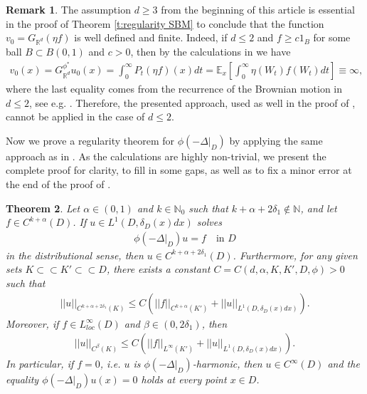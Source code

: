 \documentclass[12pt,a4paper,onecolumn]{amsart}
\newtheorem{thm}{Theorem}[section]
\theoremstyle{definition}
\newtheorem{rem}[thm]{Remark}
\newcommand{\R}{\mathbb{R}}
\newcommand{\N}{\mathbb{N}}
\newcommand{\ex}{\mathbb{E}}
\newcommand{\subsub}{\subset\subset}
\newcommand{\1}{\mathbf 1}
\newcommand{\LLL}{L^1(D,\de(x)dx)}
\newcommand{\Lo}{\phi(-\left.\Delta\right\vert_{D})}
\newcommand{\de}{\delta_D}
\numberwithin{equation}{section}
\begin{document}
 
\begin{rem}\label{r:Gf indefinite no1}
The assumption $d\ge3$ from the beginning of this article is essential in the proof of Theorem \ref{t:regularity SBM} to conclude that the function $v_0=G_{\R^d}(\eta f)$ is well defined and finite. Indeed, if $d\le 2$ and $f\ge c1_B$ for some ball $B\subset B(0,1)$ and $c>0$, then by the calculations in \cite[Propsition 14.2]{bernstein} we have
    \begin{align*}
        v_0(x)=G^{\phi^*}_{\R^d}u_0(x)=\int_0^\infty P_t(\eta f)(x)dt=\ex_x\left[\int_0^\infty \eta(W_t)f(W_t)dt\right]\equiv \infty,
    \end{align*}
    where the last equality comes from the recurrence of the Brownian motion in $d\le 2$, see e.g. \cite[Theorem 3.27]{morters_peres_BM}. Therefore, the presented approach, used as well in the proof of \cite[Proposition 2.8]{Silvestre2007regularity}, cannot be applied in the case of $d\le 2$.
\end{rem}


Now we prove a regularity theorem for $\Lo$ by applying the same approach as in \cite[Lemma 21]{AbaDupaNonhomo2017}. As the calculations are highly non-trivial, we present the complete proof for clarity, to fill in some gaps, as well as to fix a minor error at the end of the proof of \cite[Lemma 21]{AbaDupaNonhomo2017}.

\begin{thm}\label{t:regularity SKBM}
    Let $\alpha\in(0,1)$ and $k\in  \N_0$ such that $k+\alpha+2\delta_1\notin\N$, and let $f\in C^{k+\alpha}(D)$. If $u\in \LLL$ solves 
    \begin{align}\label{eq:sprectral_linear}
        \Lo u = f \quad\text{in $D$}
    \end{align}
    in the distributional sense, then $u\in C^{k+\alpha+2\delta_1}(D)$. Furthermore, for any given sets $K\subsub K'\subsub D$, there exists a constant $C=C(d,\alpha,K,K',D,\phi)>0$ such that
    \begin{align}\label{eq:t:spectral smooth1}
	|| u ||_{C^{k+\alpha+2\delta_1}(K)} \le C \left(|| f||_{C^{k+\alpha}(K')}+|| u ||_{\LLL}\right).
    \end{align}
    Moreover, if $f\in L^\infty_{loc}(D)$ and $\beta\in(0,2\delta_1)$, then
    \begin{align}\label{eq:t:spectral smooth2}
	|| u ||_{C^{\beta}(K)} \le C \left(|| f ||_{L^\infty(K')}+|| u ||_{\LLL}\right).
    \end{align}
    In particular, if $f=0$, i.e. $u$ is $\Lo$-harmonic, then $u\in C^\infty(D)$ and the equality $\Lo u(x)=0$ holds at every point $x\in D$.
\end{thm}
\end{document}

